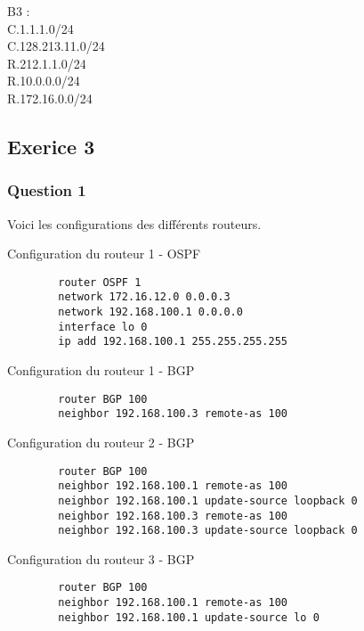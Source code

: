 \documentclass[12pt, a4paper]{article}
\begin{document}
    B3 : \\
    C.1.1.1.0/24\\
    C.128.213.11.0/24\\
    R.212.1.1.0/24\\
    R.10.0.0.0/24\\
    R.172.16.0.0/24\\

    \subsection{Exerice 3}
    \subsubsection{Question 1}
    Voici les configurations des différents routeurs. 
    \begin{listing}[H]
        \caption{Configuration du routeur 1 - OSPF}
        \label{lst:r1o}
        \begin{verbatim}
        router OSPF 1 
        network 172.16.12.0 0.0.0.3
        network 192.168.100.1 0.0.0.0
        interface lo 0
        ip add 192.168.100.1 255.255.255.255
        \end{verbatim}
    \end{listing}

    \begin{listing}[H]
        \caption{Configuration du routeur 1 - BGP}
        \label{lst:r1b}
        \begin{verbatim}
        router BGP 100
        neighbor 192.168.100.3 remote-as 100
        \end{verbatim}
    \end{listing}

    \begin{listing}[H]
        \caption{Configuration du routeur 2 - BGP}
        \label{lst:r2b}
        \begin{verbatim}
        router BGP 100
        neighbor 192.168.100.1 remote-as 100
        neighbor 192.168.100.1 update-source loopback 0
        neighbor 192.168.100.3 remote-as 100
        neighbor 192.168.100.3 update-source loopback 0
        \end{verbatim}
    \end{listing}

    \begin{listing}[H]
        \caption{Configuration du routeur 3 - BGP}
        \label{lst:r3b}
        \begin{verbatim}
        router BGP 100
        neighbor 192.168.100.1 remote-as 100
        neighbor 192.168.100.1 update-source lo 0
        \end{verbatim}
    \end{listing}
\end{document}
